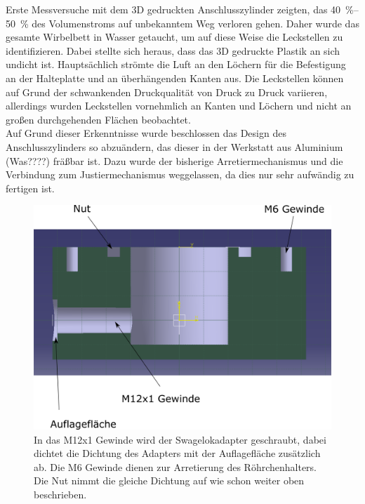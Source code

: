 Erste Messversuche mit dem 3D gedruckten Anschlusszylinder zeigten, das \SIrange{40}{50}{\%} des Volumenstroms auf unbekanntem Weg verloren gehen. Daher wurde das gesamte Wirbelbett in Wasser getaucht, um auf diese Weise die Leckstellen zu identifizieren. Dabei stellte sich heraus, dass das 3D gedruckte Plastik an sich undicht ist. Hauptsächlich strömte die Luft an den Löchern für die Befestigung an der Halteplatte und an überhängenden Kanten aus. Die Leckstellen können auf Grund der schwankenden Druckqualität von Druck zu Druck variieren, allerdings wurden Leckstellen vornehmlich an Kanten und Löchern und nicht an großen durchgehenden Flächen beobachtet. \\
Auf Grund dieser Erkenntnisse wurde beschlossen das Design des Anschlusszylinders so abzuändern, das dieser in der Werkstatt aus Aluminium (Was????) fräßbar ist. Dazu wurde der bisherige Arretiermechanismus und die Verbindung zum Justiermechanismus weggelassen, da dies nur sehr aufwändig zu fertigen ist.

\begin{figure}[h]
	\begin{center}
		\includegraphics[scale=0.5]{Schnitt_AnschlusszylinderV2.png}
		\caption[Schnitt Zylinder V2]{In das M12x1 Gewinde wird der Swagelokadapter geschraubt, dabei dichtet die Dichtung des Adapters mit der Auflagefläche zusätzlich ab. Die M6 Gewinde dienen zur Arretierung des Röhrchenhalters. Die Nut nimmt die gleiche Dichtung auf wie schon weiter oben beschrieben.}
	\end{center}
\end{figure}

